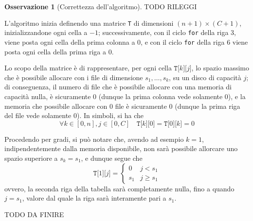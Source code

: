 \documentclass[14pt]{extreport}
\theoremstyle{definition}
\theoremstyle{definition}
\newtheorem{remark}{Osservazione}[subsection]
\begin{document}
\begin{remark}[Correttezza dell'algoritmo]
    TODO RILEGGI

    L'algoritmo inizia definendo una matrice \texttt{T} di dimensioni $(n + 1) \times (C + 1)$, inizializzandone ogni cella a $-1$; successivamente, con il ciclo \texttt{for} della riga 3, viene posta ogni cella della prima colonna a 0, e con il ciclo \texttt{for} della riga 6 viene posta ogni cella della prima riga a 0.

    Lo scopo della matrice è di rappresentare, per ogni cella $\texttt{T[}k\texttt{][}j\texttt{]}$, lo spazio massimo che è possibile allocare con i file di dimensione $s_1, \ldots, s_k$, su un disco di capacità $j$; di conseguenza, il numero di file che è possibile allocare con una memoria di capacità nulla, è sicuramente 0 (dunque la prima colonna vede solamente 0), e la memoria che possibile allocare con 0 file è sicuramente 0 (dunque la prima riga del file vede solamente 0). In simboli, si ha che $$\forall k \in [0, n], j \in [0, C] \quad \texttt{T[}k\texttt{][}0\texttt{]} = \texttt{T[}0\texttt{][}k\texttt{]} = 0$$

    Procedendo per gradi, si può notare che, avendo ad esempio $k = 1$, indipendentemente dalla memoria disponibile, non sarà possibile allorcare uno spazio superiore a $s_k = s_1$, e dunque segue che $$\texttt{T[}1\texttt{][}j\texttt{]}= \left \{ \begin{array}{ll} 0 & j < s_1 \\ s_1 & j \ge s_1 \end{array} \right.$$ ovvero, la seconda riga della tabella sarà completamente nulla, fino a quando $j = s_1$, valore dal quale la riga sarà interamente pari a $s_1$.

    TODO DA FINIRE

\end{remark}
\end{document}
